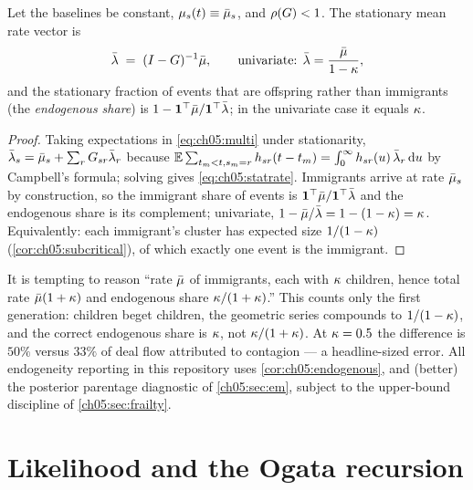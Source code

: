 \begin{corollary}\label{cor:ch05:endogenous}
Let the baselines be constant, $\mu_s(t) \equiv \bar{\mu}_s$, and
$\rho\!\left(G\right) < 1$. The stationary mean rate vector is
\begin{equation}\label{eq:ch05:statrate}
\bar{\lambda} \;=\; (I - G)^{-1} \bar{\mu},
\qquad\text{univariate: } \bar{\lambda} = \frac{\bar{\mu}}{1 - \kappa},
\end{equation}
and the stationary fraction of events that are offspring rather than
immigrants (the \emph{endogenous share}) is $1 - \mathbf{1}^\top\bar{\mu} /
\mathbf{1}^\top\bar{\lambda}$; in the univariate case it equals $\kappa$.
\end{corollary}

\begin{proof}
Taking expectations in \cref{eq:ch05:multi} under stationarity,
$\bar{\lambda}_s = \bar{\mu}_s + \sum_r G_{sr}\bar{\lambda}_r$ because
$\mathbb{E} \sum_{t_m<t, s_m=r} h_{sr}(t-t_m) = \int_0^\infty
h_{sr}(u)\, \bar{\lambda}_r \,\mathrm{d} u$ by Campbell's formula; solving gives
\cref{eq:ch05:statrate}. Immigrants arrive at rate $\bar{\mu}_s$ by
construction, so the immigrant share of events is
$\mathbf{1}^\top\bar{\mu}/\mathbf{1}^\top\bar{\lambda}$ and the endogenous share
is its complement; univariate, $1 - \bar{\mu}/\bar{\lambda} = 1 - (1-\kappa) =
\kappa$. Equivalently: each immigrant's cluster has expected size
$1/(1-\kappa)$ (\cref{cor:ch05:subcritical}), of which exactly one event
is the immigrant.
\end{proof}

\begin{remark}\label{rem:ch05:accounting}
It is tempting to reason ``rate $\bar{\mu}$ of immigrants, each with
$\kappa$ children, hence total rate $\bar{\mu}(1+\kappa)$ and endogenous
share $\kappa/(1+\kappa)$.'' This counts only the first generation:
children beget children, the geometric series compounds to
$1/(1-\kappa)$, and the correct endogenous share is $\kappa$, not
$\kappa/(1+\kappa)$. At $\kappa = 0.5$ the difference is $50\%$ versus
$33\%$ of deal flow attributed to contagion --- a headline-sized error.
All endogeneity reporting in this repository uses
\cref{cor:ch05:endogenous}, and (better) the posterior parentage
diagnostic of \cref{ch05:sec:em}, subject to the upper-bound discipline of
\cref{ch05:sec:frailty}.
\end{remark}

\section{Likelihood and the Ogata recursion}\label{ch05:sec:likelihood}


